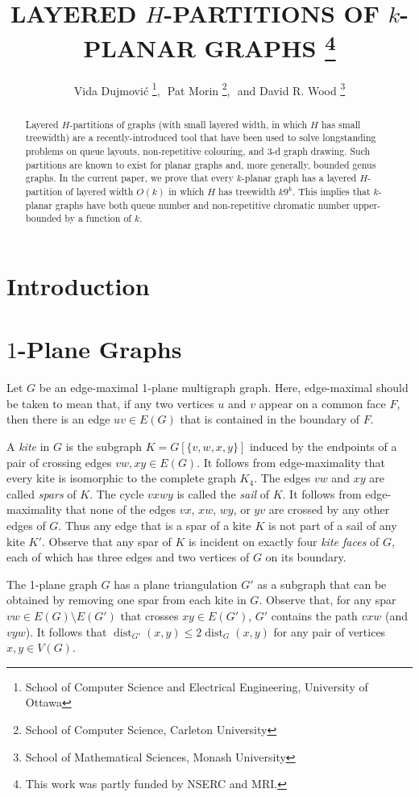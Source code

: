 \documentclass{patmorin}
\title{\MakeUppercase{Layered $H$-Partitions of $k$-Planar Graphs}%
    \thanks{This work was partly funded by NSERC and MRI.}}
\author{Vida Dujmovi\'c%
        \thanks{School of Computer Science and Electrical Engineering,
                University of Ottawa},\,\,
        Pat Morin%
        \thanks{School of Computer Science, Carleton University},\,\, and
        David R. Wood%
        \thanks{School of Mathematical Sciences, Monash University}}
\DeclareMathOperator{\dist}{dist}
\begin{document}
\maketitle


\begin{abstract}
  Layered $H$-partitions of graphs (with small layered width, in which $H$ has small treewidth) are a recently-introduced tool that have been used to solve longstanding problems on queue layouts, non-repetitive colouring, and 3-d graph drawing.  Such partitions are known to exist for planar graphs and, more generally, bounded genus graphs.  In the current paper, we prove that every $k$-planar graph has a layered $H$-partition of layered width $O(k)$ in which $H$ has treewidth $k9^k$. This implies that $k$-planar graphs have both queue number and non-repetitive chromatic number upper-bounded by a function of $k$.
\end{abstract}

\section{Introduction}


\section{$1$-Plane Graphs}

Let $G$ be an edge-maximal 1-plane multigraph graph.  Here, edge-maximal should be taken to mean that, if any two vertices $u$ and $v$ appear on a common face $F$, then there is an edge $uv\in E(G)$ that is contained in the boundary of $F$.

A \emph{kite} in $G$ is the subgraph $K=G[\{v,w,x,y\}]$ induced by the endpoints of a pair of crossing edges $vw,xy\in E(G)$.  It follows from edge-maximality that every kite is isomorphic to the complete graph $K_4$.
The edges $vw$ and $xy$ are called \emph{spars} of $K$.  The cycle $vxwy$ is called the \emph{sail} of $K$.  It follows from edge-maximality that none of the edges $vx$, $xw$, $wy$, or $yv$ are crossed by any other edges of $G$. Thus any edge that is a spar of a kite $K$ is not part of a sail of any kite $K'$. Observe that any spar of $K$ is incident on exactly four \emph{kite faces} of $G$, each of which has three edges and two vertices of $G$ on its boundary.

The 1-plane graph $G$ has a plane triangulation $G'$ as a subgraph that can be obtained by removing one spar from each kite in $G$.  Observe that, for any spar $vw\in E(G)\setminus E(G')$ that crosses $xy\in E(G')$, $G'$ contains the path $vxw$ (and $vyw$).  It follows that $\dist_{G'}(x,y)\le 2\dist_G(x,y)$ for any pair of vertices $x,y\in V(G)$.
\end{document}
